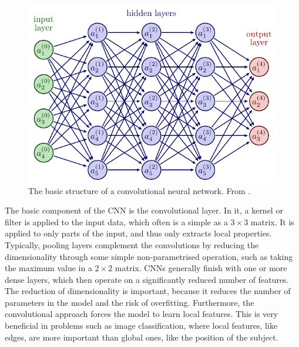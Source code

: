 \begin{figure}
    \centering
    \includegraphics[width=0.8\linewidth, page=7]{tex/02_ml/neural_networks.pdf}
    \caption{
        The basic structure of a convolutional neural network.
        From \cite{nn_figs}.
    }
    \label{fig:cnn}
\end{figure}

The basic component of the CNN is the convolutional layer.
In it, a kernel or filter is applied to the input data, which often is a simple as a $3 \times 3$ matrix.
It is applied to only parts of the input, and thus only extracts local properties.
Typically, pooling layers complement the convolutions by reducing the dimensionality through some simple non-parametrised operation, such as taking the maximum value in a $2 \times 2$ matrix.
CNNs generally finish with one or more dense layers, which then operate on a significantly reduced number of features.
The reduction of dimensionality is important, because it reduces the number of parameters in the model and the risk of overfitting.
Furthermore, the convolutional approach forces the model to learn local features.
This is very beneficial in problems such as image classification, where local features, like edges, are more important than global ones, like the position of the subject.
